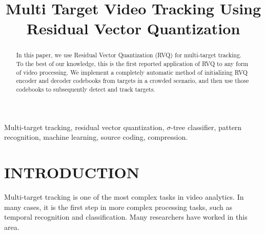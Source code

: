 \documentclass{article}
\title{Multi Target Video Tracking Using Residual Vector Quantization}
\begin{document}
\maketitle


\begin{abstract}
In this paper, we use Residual Vector Quantization (RVQ) for multi-target tracking.  To the best of our knowledge, this is the first reported application of RVQ to any form of video processing.  We implement a completely automatic method of initializing RVQ encoder and decoder codebooks from targets in a crowded scenario, and then use those codebooks to subsequently detect and track targets.
\end{abstract}

\begin{keywords}
Multi-target tracking, residual vector quantization, $\sigma$-tree classifier, pattern recognition, machine learning, source coding, compression.
\end{keywords}


\section{INTRODUCTION}
Multi-target tracking is one of the most complex tasks in video analytics.  In many cases, it is the first step in more complex processing tasks, such as temporal recognition and classification.  Many researchers have worked in this area.  
\end{document}
